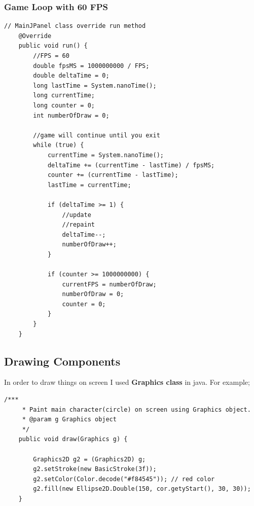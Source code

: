 \documentclass{article}
\begin{document}
\subsubsection{Game Loop with 60 FPS}
\begin{lstlisting}[style=CStyle]
	// MainJPanel class override run method
    @Override
    public void run() {
        //FPS = 60
        double fpsMS = 1000000000 / FPS;
        double deltaTime = 0;
        long lastTime = System.nanoTime();
        long currentTime;
        long counter = 0;
        int numberOfDraw = 0;

        //game will continue until you exit
        while (true) {
            currentTime = System.nanoTime();
            deltaTime += (currentTime - lastTime) / fpsMS;
            counter += (currentTime - lastTime);
            lastTime = currentTime;

            if (deltaTime >= 1) {
                //update
                //repaint
                deltaTime--;
                numberOfDraw++;
            }

            if (counter >= 1000000000) {
                currentFPS = numberOfDraw;
                numberOfDraw = 0;
                counter = 0;
            }
        }
    }
\end{lstlisting}

\subsection{Drawing Components}
In order to draw things on screen I used \textbf{Graphics class} in java. For example;
\begin{lstlisting}[style=CStyle]
	/***
	 * Paint main character(circle) on screen using Graphics object.
	 * @param g Graphics object
	 */
    public void draw(Graphics g) {

        Graphics2D g2 = (Graphics2D) g;
        g2.setStroke(new BasicStroke(3f));
        g2.setColor(Color.decode("#f84545")); // red color
        g2.fill(new Ellipse2D.Double(150, cor.getyStart(), 30, 30));
    }
\end{lstlisting}
\end{document}

